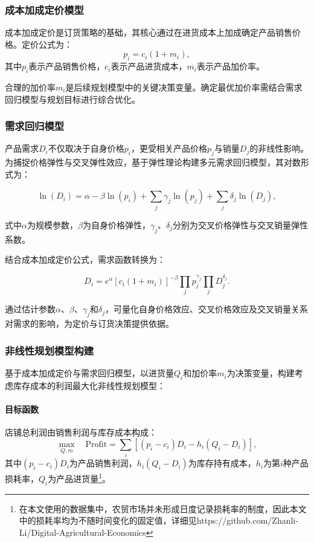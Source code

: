 \documentclass[lang=cn,12pt,a4paper]{elegantpaper}
\begin{document}
\subsubsection{成本加成定价模型}
\label{subsubsec:cost_plus_pricing}
成本加成定价是订货策略的基础，其核心通过在进货成本上加成确定产品销售价格。定价公式为：
\begin{equation}
p_i = c_i  (1 + m_i),
\label{eq:cs1}
\end{equation}
其中$p_i$表示产品销售价格，$c_i$表示产品进货成本，$m_i$表示产品加价率。

合理的加价率$m_i$是后续规划模型中的关键决策变量。确定最优加价率需结合需求回归模型与规划目标进行综合优化。

\subsubsection{需求回归模型}
\label{subsubsec:demand_regression_model}
产品需求$D_i$不仅取决于自身价格$p_i$，更受相关产品价格$p_j$与销量$D_j$的非线性影响。为捕捉价格弹性与交叉弹性效应，基于弹性理论构建多元需求回归模型，其对数形式为：

\begin{equation}
\ln(D_i) = \alpha - \beta \ln(p_i) + \sum_j \gamma_j \ln(p_j) + \sum_j \delta_j \ln(D_j),
\label{eq:cs2}
\end{equation}

式中$\alpha$为规模参数，$\beta$为自身价格弹性，$\gamma_j$、$\delta_j$分别为交叉价格弹性与交叉销量弹性系数。

结合成本加成定价公式，需求函数转换为：

\begin{equation}
D_i = e^{\alpha} [c_i(1 + m_i)]^{-\beta} \prod_j p_j^{\gamma_j} \prod_j D_j^{\delta_j}.
\label{eq:cs2}
\end{equation}

通过估计参数$\alpha$、$\beta$、$\gamma_j$和$\delta_j$，可量化自身价格效应、交叉价格效应及交叉销量关系对需求的影响，为定价与订货决策提供依据。

\subsubsection{非线性规划模型构建}
\label{subsubsec:nonlinear_programming_model}
基于成本加成定价与需求回归模型，以进货量$Q_i$和加价率$m_i$为决策变量，构建考虑库存成本的利润最大化非线性规划模型：

\paragraph{目标函数}
店铺总利润由销售利润与库存成本构成：
\begin{equation}
\max_{Q, m} \quad \text{Profit} = \sum_i [(p_i - c_i)  D_i - h_i  (Q_i - D_i)],
\end{equation}
其中$(p_i - c_i)  D_i$为产品销售利润，$h_i  (Q_i - D_i)$为库存持有成本，$h_i$为第$i$种产品损耗率，$Q_i$为产品进货量\footnote{在本文使用的数据集中，农贸市场并未形成日度记录损耗率的制度，因此本文中的损耗率均为不随时间变化的固定值，详细见https://github.com/Zhanli-Li/Digital-Agricultural-Economics}。
\end{document}
